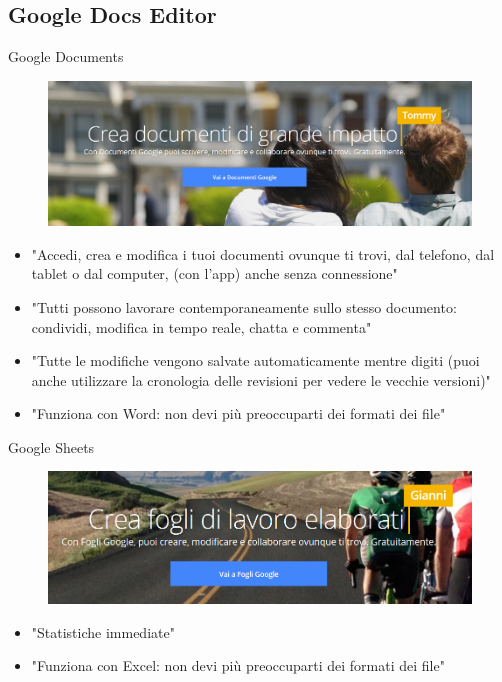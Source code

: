 \documentclass{beamer}
\begin{document}
\subsection{Google Docs Editor}
\begin{frame}{Google Documents}
\begin{figure}[h!]
\includegraphics[height=0.3\textheight]{immagini/docs.png}
\end{figure}
\footnotesize
\begin{itemize}
\color{mygreen}
\item "Accedi, crea e modifica i tuoi documenti ovunque ti trovi, dal telefono, dal tablet o dal computer, (con l'app) anche senza connessione"
\item "Tutti possono lavorare contemporaneamente sullo stesso documento: condividi, modifica in tempo reale, chatta e commenta"
\item "Tutte le modifiche vengono salvate automaticamente mentre digiti (puoi anche utilizzare la cronologia delle revisioni per vedere le vecchie versioni)"
\color{black}
\item "Funziona con Word: non devi più preoccuparti dei formati dei file"
\end{itemize}
\end{frame}
\begin{frame}{Google Sheets}
\begin{figure}[h!]
\includegraphics[height=0.3\textheight]{immagini/sheets.png}
\end{figure}
\footnotesize
\begin{itemize}
\item "Statistiche immediate"
\item "Funziona con Excel: non devi più preoccuparti dei formati dei file"
\end{itemize}
\end{frame}
\end{document}
